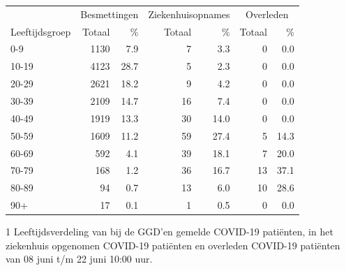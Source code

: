 \documentclass[
  english,
  man,floatsintext]{apa6}
\begin{document}
\begin{table}
\centering\begingroup\fontsize{11}{13}\selectfont

\begin{threeparttable}
\begin{tabular}{lrrrrrr}
\toprule
\multicolumn{1}{c}{ } & \multicolumn{2}{c}{Besmettingen} & \multicolumn{2}{c}{Ziekenhuisopnames} & \multicolumn{2}{c}{Overleden} \\
\cmidrule(l{3pt}r{3pt}){2-3} \cmidrule(l{3pt}r{3pt}){4-5} \cmidrule(l{3pt}r{3pt}){6-7}
Leeftijdsgroep & Totaal & \% & Totaal & \% & Totaal & \%\\
\midrule
0-9 & 1130 & 7.9 & 7 & 3.3 & 0 & 0.0\\
10-19 & 4123 & 28.7 & 5 & 2.3 & 0 & 0.0\\
20-29 & 2621 & 18.2 & 9 & 4.2 & 0 & 0.0\\
30-39 & 2109 & 14.7 & 16 & 7.4 & 0 & 0.0\\
40-49 & 1919 & 13.3 & 30 & 14.0 & 0 & 0.0\\
50-59 & 1609 & 11.2 & 59 & 27.4 & 5 & 14.3\\
60-69 & 592 & 4.1 & 39 & 18.1 & 7 & 20.0\\
70-79 & 168 & 1.2 & 36 & 16.7 & 13 & 37.1\\
80-89 & 94 & 0.7 & 13 & 6.0 & 10 & 28.6\\
90+ & 17 & 0.1 & 1 & 0.5 & 0 & 0.0\\
\bottomrule
\end{tabular}
\begin{tablenotes}
\item[1] Leeftijdsverdeling van bij de GGD’en gemelde COVID-19 patiënten, in het ziekenhuis opgenomen COVID-19 patiënten en overleden COVID-19 patiënten van 08 juni t/m 22 juni 10:00 uur.
\end{tablenotes}
\end{threeparttable}
\endgroup{}
\end{table}

\newpage
\end{document}
